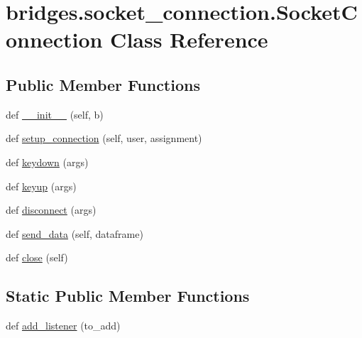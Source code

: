 \hypertarget{classbridges_1_1socket__connection_1_1_socket_connection}{}\section{bridges.\+socket\+\_\+connection.\+Socket\+Connection Class Reference}
\label{classbridges_1_1socket__connection_1_1_socket_connection}
\subsection*{Public Member Functions}
\begin{DoxyCompactItemize}
\item 
def \hyperlink{classbridges_1_1socket__connection_1_1_socket_connection_ae241a5233f4cb8ad07e9a716ebfa3e55}{\+\_\+\+\_\+init\+\_\+\+\_\+} (self, b)
\item 
def \hyperlink{classbridges_1_1socket__connection_1_1_socket_connection_a346d70ef1084f4387df0f3027ac0f527}{setup\+\_\+connection} (self, user, assignment)
\item 
def \hyperlink{classbridges_1_1socket__connection_1_1_socket_connection_a6acd8ac3ac9d055de1ba086b447fbe7f}{keydown} (args)
\item 
def \hyperlink{classbridges_1_1socket__connection_1_1_socket_connection_a4ee952f67b32414fba663d5e9c53bf14}{keyup} (args)
\item 
def \hyperlink{classbridges_1_1socket__connection_1_1_socket_connection_a50b0181494d99f9a33bf7fb75c100842}{disconnect} (args)
\item 
def \hyperlink{classbridges_1_1socket__connection_1_1_socket_connection_a6f120b756e07aab0742ed42466984b31}{send\+\_\+data} (self, dataframe)
\item 
def \hyperlink{classbridges_1_1socket__connection_1_1_socket_connection_a38dd36c5ac674016d526e8cd2c515ac4}{close} (self)
\end{DoxyCompactItemize}
\subsection*{Static Public Member Functions}
\begin{DoxyCompactItemize}
\item 
def \hyperlink{classbridges_1_1socket__connection_1_1_socket_connection_a21d94eb97d7ea92e38dc8e78f1e40876}{add\+\_\+listener} (to\+\_\+add)
\end{DoxyCompactItemize}
